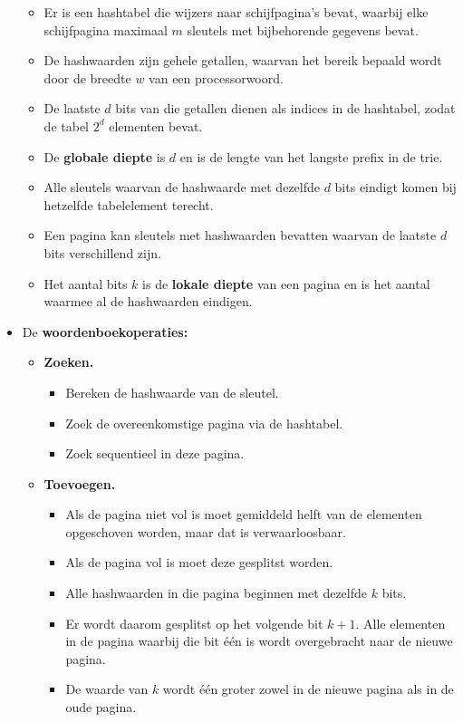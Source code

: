 \begin{itemize}
\begin{itemize}
        \item Er is een hashtabel die wijzers naar schijfpagina's bevat, waarbij elke schijfpagina maximaal $m$ sleutels met bijbehorende gegevens bevat.
        \item De hashwaarden zijn gehele getallen, waarvan het bereik bepaald wordt door de breedte $w$ van een processorwoord.
        \item De laatste $d$ bits van die getallen dienen als indices in de hashtabel, zodat de tabel $2^d$ elementen bevat.
        \item De \textbf{globale diepte} is $d$ en is de lengte van het langste prefix in de trie.
        \item Alle sleutels waarvan de hashwaarde met dezelfde $d$ bits eindigt komen bij hetzelfde tabelelement terecht.
        \item Een pagina kan sleutels met hashwaarden bevatten waarvan de laatste $d$ bits verschillend zijn.
        \item Het aantal bits $k$ is de \textbf{lokale diepte} van een pagina en is het aantal waarmee al de hashwaarden eindigen.
    \end{itemize}
    \item De \textbf{woordenboekoperaties:}
    \begin{itemize}
        \item \textbf{Zoeken.}
        \begin{itemize}
            \item Bereken de hashwaarde van de sleutel.
            \item Zoek de overeenkomstige pagina via de hashtabel.
            \item Zoek sequentieel in deze pagina.
        \end{itemize}
        \item \textbf{Toevoegen.}
        \begin{itemize}
            \item Als de pagina niet vol is moet gemiddeld helft van de elementen opgeschoven worden, maar dat is verwaarloosbaar.
            \item Als de pagina vol is moet deze gesplitst worden.
            \item Alle hashwaarden in die pagina beginnen met dezelfde $k$ bits.
            \item Er wordt daarom gesplitst op het volgende bit $k + 1$. Alle elementen in de pagina waarbij die bit één is wordt overgebracht naar de nieuwe pagina.
            \item De waarde van $k$ wordt één groter zowel in de nieuwe pagina als in de oude pagina.

\end{itemize}
\end{itemize}
\end{itemize}
